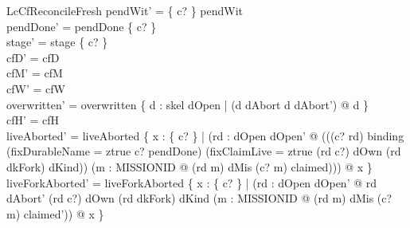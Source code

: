 \documentclass[a4paper,10pt,fleqn]{article}
\begin{document}
\begin{schema}{LcCfReconcileFresh}
pendWit' = \{ c? \} \ndres pendWit \\
pendDone' = pendDone \setminus \{ c? \} \\
stage' = stage \oplus \{ c?  \} \\
cfD' = cfD \\
cfM' = cfM \\
cfW' = cfW \\
overwritten' = overwritten \cup \{ d : skel \setminus dOpen | (d \in dAbort \iff d \notin dAbort') @ d \} \\
cfH' = cfH \\
liveAborted' = liveAborted \cup \{ x : \{ c? \} | (\exists rd : dOpen \setminus dOpen' @ (((c? \mapsto rd) \in binding \lor (fixDurableName = ztrue \land c? \in pendDone) \lor (fixClaimLive = ztrue \land (rd \mapsto c?) \in dOwn \land (rd \mapsto dkFork) \in dKind)) \land (\exists m : MISSIONID @ (rd \mapsto m) \in dMis \land (c? \mapsto m) \in claimed))) @ x \} \\
liveForkAborted' = liveForkAborted \cup \{ x : \{ c? \} | (\exists rd : dOpen \setminus dOpen' @ rd \in dAbort' \land (rd \mapsto c?) \in dOwn \land (rd \mapsto dkFork) \in dKind \land (\exists m : MISSIONID @ (rd \mapsto m) \in dMis \land (c? \mapsto m) \in claimed')) @ x \}
\end{schema}
\end{document}
